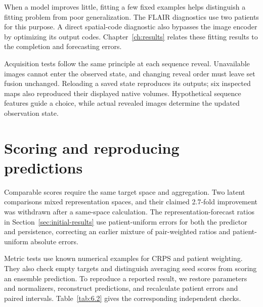 When a model improves little, fitting a few fixed examples helps distinguish a fitting problem from poor generalization. The FLAIR diagnostics use two patients for this purpose. A direct spatial-code diagnostic also bypasses the image encoder by optimizing its output codes. Chapter~\ref{ch:results} relates these fitting results to the completion and forecasting errors.

Acquisition tests follow the same principle at each sequence reveal. Unavailable images cannot enter the observed state, and changing reveal order must leave set fusion unchanged. Reloading a saved state reproduces its outputs; six inspected maps also reproduced their displayed native volumes. Hypothetical sequence features guide a choice, while actual revealed images determine the updated observation state.

\section{Scoring and reproducing predictions}

Comparable scores require the same target space and aggregation. Two latent comparisons mixed representation spaces, and their claimed 2.7-fold improvement was withdrawn after a same-space calculation. The representation-forecast ratios in Section~\ref{sec:initial-results} use patient-uniform errors for both the predictor and persistence, correcting an earlier mixture of pair-weighted ratios and patient-uniform absolute errors.

Metric tests use known numerical examples for CRPS and patient weighting. They also check empty targets and distinguish averaging seed scores from scoring an ensemble prediction. To reproduce a reported result, we restore parameters and normalizers, reconstruct predictions, and recalculate patient errors and paired intervals. Table~\ref{tab:6.2} gives the corresponding independent checks.


